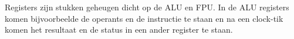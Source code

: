 Registers zijn stukken geheugen dicht op de ALU en FPU. In de ALU registers komen bijvoorbeelde de operants en de instructie te staan en na een clock-tik komen het resultaat en de status in een ander register te staan.

